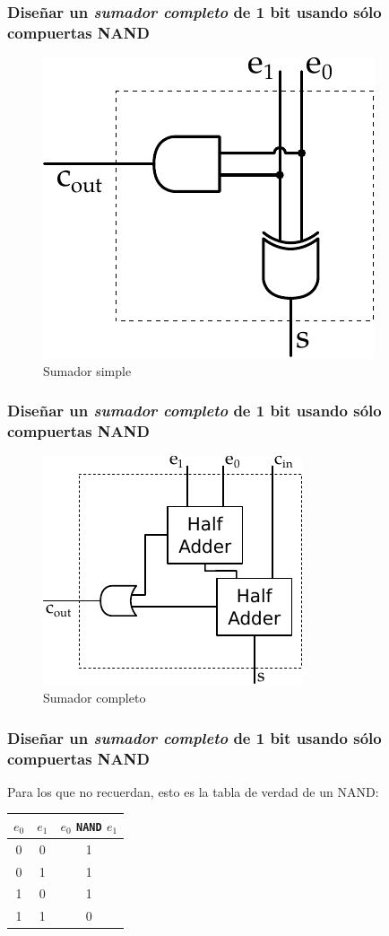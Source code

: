 \documentclass[mathserif,hyperref]{beamer}
\begin{document}
\begin{frame}
\frametitle{\small Diseñar un \textit{sumador completo} de 1 bit usando sólo
compuertas NAND}
\begin{figure}[htp]
  \caption{Sumador simple}
  \includegraphics[scale=0.9]{sumador-simple.pdf}
\end{figure}
\end{frame}


\begin{frame}
\frametitle{\small Diseñar un \textit{sumador completo} de 1 bit usando sólo
compuertas NAND}
\begin{figure}[htp]
  \caption{Sumador completo}
  \includegraphics[scale=0.9]{sumador-completo.pdf}
\end{figure}
\end{frame}


\begin{frame}
\frametitle{\small Diseñar un \textit{sumador completo} de 1 bit usando sólo
compuertas NAND}
Para los que no recuerdan, esto es la tabla de verdad de un NAND:
\begin{center}\begin{tabular}{| c | c || c |}
  \hline
  $e_0$ & $e_1$ & $e_0$ \texttt{NAND} $e_1$ \\ \hline
    0   &   0   &             1             \\
    0   &   1   &             1             \\
    1   &   0   &             1             \\
    1   &   1   &             0             \\
  \hline
\end{tabular}\end{center}
\end{frame}
\end{document}
